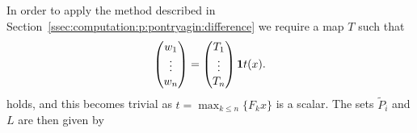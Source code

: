 \documentclass[smallextended]{svjour3}       %
\numberwithin{equation}{section}
\DeclareMathOperator*{\conv}{conv}
\begin{document}
In order to apply the method described in Section~\ref{ssec:computation:p:pontryagin:difference} we require a map $T$ such that 
%
$$
\begin{pmatrix}
w_1\\ \vdots \\ w_n
\end{pmatrix} = \begin{pmatrix}T_1\\\vdots\\T_n\end{pmatrix}{\bf{1}}t(x).
$$
%
holds, and this becomes trivial as $t=\max_{k\leq n} \{F_kx\}$ is a scalar.
% 
The sets $\tilde P_i$ and $L$ are then given by
%
\end{document}
